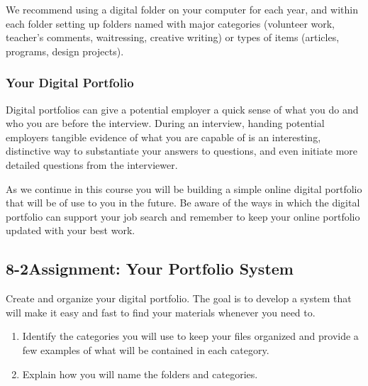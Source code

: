We recommend using a digital folder on your computer for each year, and within each folder setting up folders named with major categories (volunteer work, teacher's comments, waitressing, creative writing) or types of items (articles, programs, design projects).
\subsubsection*{Your Digital Portfolio}
Digital portfolios can give a potential employer a quick sense of what you do and who you are before the interview. During an interview, handing potential employers tangible evidence of what you are capable of is an interesting, distinctive way to substantiate your answers to questions, and even initiate more detailed questions from the interviewer.

As we continue in this course you will be building a simple online digital portfolio that will be of use to you in the future. Be aware of the ways in which the digital portfolio can support your job search and remember to keep your online portfolio updated with your best work.

\pagebreak \subsection*{8-2\quad Assignment: Your Portfolio System}
Create and organize your digital portfolio. The goal is to develop a system that will make it easy and fast to find your materials whenever you need to.
\begin{enumerate}[leftmargin=1cm]
	\item Identify the categories you will use to keep your files organized and provide a few examples of what will be contained in each category.
	\item Explain how you will name the folders and categories.
\end{enumerate}


